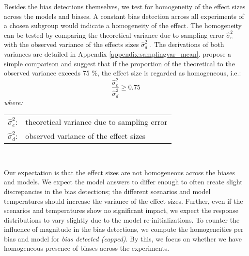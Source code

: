 \par Besides the bias detections themselves, we test for homogeneity of the effect sizes across the models and biases. A constant bias detection across all experiments of a chosen subgroup would indicate a homogeneity of the effect. The homogeneity can be tested by comparing the theoretical variance due to sampling error $\hat{\sigma}^2_{e}$ with the observed variance of the effects sizes $\hat{\sigma}^2_{d}$ \parencite{borenstein2021introduction, cooper2019handbook, morris2002combining, nakagawa2023quantitative}. The derivations of both variances are detailed in Appendix \ref{appendix:samplingvar_mean}. \textcite{hunter2004methods} propose a simple comparison and suggest that if the proportion of the theoretical to the observed variance exceeds 75 \%, the effect size is regarded as homogeneous, i.e.:
\begin{equation} \label{eq:homogeneity}
    \frac{\hat{\sigma}^2_{e}}{\hat{\sigma}^2_{d}} \geq 0.75
\end{equation}
\hspace{0.5cm} \textit{where:} \\
\hspace*{3em}
\begin{tabular}{rl}
    $\hat{\sigma}^2_{e}$:& theoretical variance due to sampling error \\
    $\hat{\sigma}^2_{d}$:& observed variance of the effect sizes \\
\end{tabular} \\

\par Our expectation is that the effect sizes are not homogeneous across the biases and models. We expect the model answers to differ enough to often create slight discrepancies in the bias detections; the different scenarios and model temperatures should increase the variance of the effect sizes. Further, even if the scenarios and temperatures show no significant impact, we expect the response distributions to vary slightly due to the model re-initializations. To counter the influence of magnitude in the bias detections, we compute the homogeneities per bias and model for \textit{bias detected (capped)}. By this, we focus on whether we have homogeneous presence of biases across the experiments.

